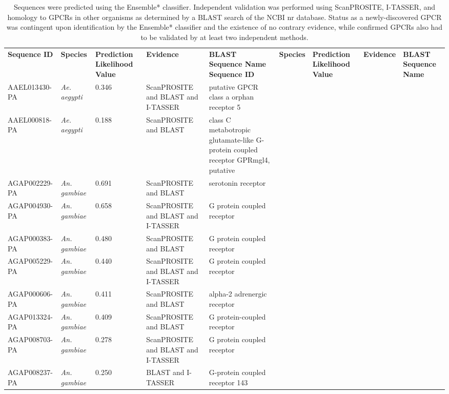 \begin{longtable}{| l | l | p{2cm} | p{3.25cm} | p{3.5cm} |}
\caption{\label{tab:novel-gpcrs} \uppercase{Newly-Discovered GPCRs Identified by Ensemble*}.} \\ \hline
\textbf{Sequence ID} & \textbf{Species} & \textbf{Prediction Likelihood Value} & \textbf{Evidence} & \textbf{BLAST Sequence Name}
\endfirsthead
\hline
\textbf{Sequence ID} & \textbf{Species} & \textbf{Prediction Likelihood Value} & \textbf{Evidence} & \textbf{BLAST Sequence Name} \endhead
\caption*{Sequences were predicted using the Ensemble* classifier.  Independent validation was performed using ScanPROSITE, I-TASSER, and homology to GPCRs in other organisms as determined by a BLAST search of the NCBI nr database.  Status as a newly-discovered GPCR was contingent upon identification by the Ensemble* classifier and the existence of no contrary evidence, while confirmed GPCRs also had to be validated by at least two independent methods.}\\
\endlastfoot
\hline
    AAEL013430-PA & \emph{Ae. aegypti} & 0.346 & ScanPROSITE and BLAST and I-TASSER & putative GPCR class a orphan receptor 5 \\ \hline
    AAEL000818-PA & \emph{Ae. aegypti} & 0.188 & ScanPROSITE and BLAST & class C metabotropic glutamate-like G-protein coupled receptor GPRmgl4, putative \\ \hline
    AGAP002229-PA & \emph{An. gambiae} & 0.691 & ScanPROSITE and BLAST & serotonin receptor \\ \hline
    AGAP004930-PA & \emph{An. gambiae} & 0.658 & ScanPROSITE and BLAST and I-TASSER & G protein coupled receptor \\ \hline
    AGAP000383-PA & \emph{An. gambiae} & 0.480 & ScanPROSITE and BLAST & G protein coupled receptor \\ \hline
    AGAP005229-PA & \emph{An. gambiae} & 0.440 & ScanPROSITE and BLAST and I-TASSER & G protein coupled receptor \\ \hline
    AGAP000606-PA & \emph{An. gambiae} & 0.411 & ScanPROSITE and BLAST & alpha-2 adrenergic receptor \\ \hline
    AGAP013324-PA & \emph{An. gambiae} & 0.409 & ScanPROSITE and BLAST & G protein-coupled receptor \\ \hline
    AGAP008703-PA & \emph{An. gambiae} & 0.278 & ScanPROSITE and BLAST and I-TASSER & G protein coupled receptor \\ \hline
    AGAP008237-PA & \emph{An. gambiae} & 0.250 & BLAST and I-TASSER & G-protein coupled receptor 143 \\ \hline

\end{longtable}
